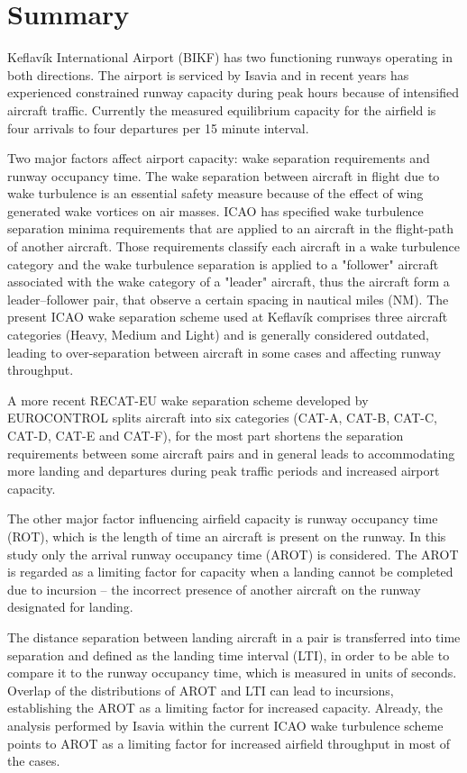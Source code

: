 


\chapter{Summary}\label{cha:summary}

Keflavík International Airport (BIKF) has two functioning runways operating in both directions. The airport is serviced by Isavia and in recent years has experienced constrained runway capacity during peak hours because of intensified aircraft traffic. Currently the measured equilibrium capacity for the airfield is four arrivals to four departures per 15 minute interval. 

Two major factors affect airport capacity: wake separation requirements and runway occupancy time. The wake  separation between aircraft in flight due to wake turbulence is an essential safety measure because of the effect of wing generated wake vortices on air masses. ICAO has specified wake turbulence separation minima requirements that are applied to an aircraft in the flight-path of another aircraft. Those requirements classify each aircraft in a wake turbulence category and the wake turbulence separation is applied to a "follower" aircraft associated with the wake category of a "leader" aircraft, thus the aircraft form a leader--follower pair, that observe a certain spacing in nautical miles (NM). The present ICAO wake separation scheme used at Keflavík comprises three aircraft categories (Heavy, Medium and Light) and is generally considered outdated, leading to over-separation between aircraft in some cases and affecting runway throughput. 

A more recent RECAT-EU wake separation scheme developed by EUROCONTROL splits aircraft into six categories (CAT-A, CAT-B, CAT-C, CAT-D, CAT-E and CAT-F), for the most part shortens the separation requirements between some aircraft pairs and in general leads to accommodating more landing and departures during peak traffic periods and increased airport capacity. 

The other major factor influencing airfield capacity is runway occupancy time (ROT), which is the length of time an aircraft is present on the runway. In this study only the arrival runway occupancy time (AROT) is considered. The AROT is regarded as a limiting factor for capacity when a landing cannot be completed due to incursion -- the incorrect presence of another aircraft on the runway designated for landing. 

The distance separation between landing aircraft in a pair is transferred into time separation and defined as the landing time interval (LTI), in order to be able to compare it to the runway occupancy time, which is measured in units of seconds. Overlap of the distributions of AROT and LTI can lead to incursions, establishing the AROT as a limiting factor for increased capacity.
Already, the analysis performed by Isavia within the current ICAO wake turbulence scheme points to AROT as a limiting factor for increased airfield throughput in most of the cases. 

